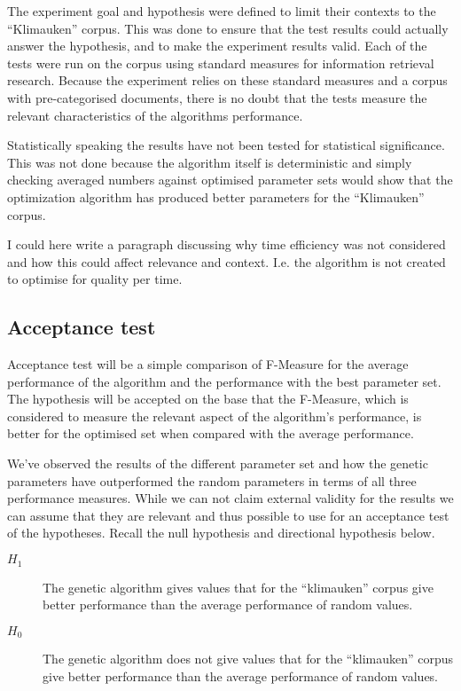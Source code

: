 The experiment goal and hypothesis were defined to limit their contexts to the ``Klimauken'' corpus. This was done to ensure that the test results could actually answer the hypothesis, and to make the experiment results valid. Each of the tests were run on the corpus using standard measures for information retrieval research. Because the experiment relies on these standard measures and a corpus with pre-categorised documents, there is no doubt that the tests measure the relevant characteristics of the algorithms performance.

Statistically speaking the results have not been tested for statistical significance. This was not done because the \CTC algorithm itself is deterministic and simply checking averaged numbers against optimised parameter sets would show that the optimization algorithm has produced better parameters for the ``Klimauken'' corpus.

I could here write a paragraph discussing why time efficiency was not considered and how this could affect relevance and context. I.e. the algorithm is not created to optimise for quality per time.

\subsection{Acceptance test}
Acceptance test will be a simple comparison of F-Measure for the average performance of the algorithm and the performance with the best parameter set. The hypothesis will be accepted on the base that the F-Measure, which is considered to measure the relevant aspect of the algorithm's performance, is better for the optimised set when compared with the average performance.

We've observed the results of the different parameter set and how the genetic parameters have outperformed the random parameters in terms of all three performance measures. While we can not claim external validity for the results we can assume that they are relevant and thus possible to use for an acceptance test of the hypotheses. Recall the null hypothesis and directional hypothesis below.

\begin{description}
	\item [\(H_{1}\)] The genetic algorithm gives values that for the ``klimauken'' corpus give better performance than the average performance of random values.
	\item [\(H_{0}\)] The genetic algorithm does not give values that for the ``klimauken'' corpus give better performance than the average performance of random values.
\end{description}

